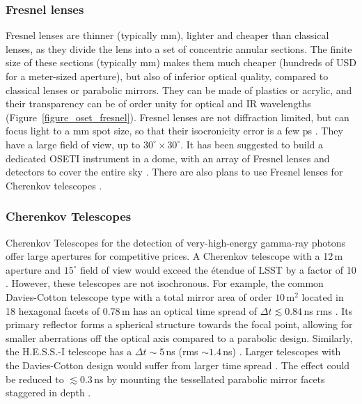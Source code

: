 \documentclass[twocolumn,tighten,longauthor]{myaastex62}
\begin{document}
\subsubsection{Fresnel lenses}
\label{sub:fresnel}
Fresnel lenses are thinner (typically mm), lighter and cheaper than classical lenses, as they divide the lens into a set of concentric annular sections. The finite size of these sections (typically mm) makes them much cheaper (hundreds of USD for a meter-sized aperture), but also of inferior optical quality, compared to classical lenses or parabolic mirrors. They can be made of plastics or acrylic, and their transparency can be of order unity for optical and IR wavelengths (Figure~\ref{figure_oset_fresnel}). Fresnel lenses are not diffraction limited, but can focus light to a mm spot size, so that their isocronicity error is a few ps \citep{2007ITNS...54..313C}. They have a large field of view, up to $30^{\circ}\times30^{\circ}$. It has been suggested to build a dedicated OSETI instrument in a dome, with an array of Fresnel lenses and detectors to cover the entire sky \citep{2013APS..APR.S2002C}. There are also plans to use Fresnel lenses for Cherenkov telescopes \citep{2002MmSAI..73.1211C,2008ICRC....3.1297M,2010arXiv1006.2266A}.


\subsubsection{Cherenkov Telescopes}
\label{sub:cherenkov}
Cherenkov Telescopes for the detection of very-high-energy gamma-ray photons offer large apertures for competitive prices. A Cherenkov telescope with a 12\,m aperture and $15^{\circ}$ field of view would exceed the \'{e}tendue of LSST by a factor of 10 \citep{2007APh....28...10V}. However, these telescopes are not isochronous. For example, the common Davies-Cotton telescope type with a total mirror area of order $10\,$m$^2$ located in 18 hexagonal facets of 0.78\,m has an optical time spread of $\Delta t\lesssim0.84\,$ns rms \citep{2013arXiv1307.3137M}. Its primary reflector forms a spherical structure towards the focal point, allowing for smaller aberrations off the optical axis compared to a parabolic design. Similarly, the H.E.S.S.-I telescope has a $\Delta t \sim 5\,$ns (rms $\sim1.4\,$ns) \citep{Akhperjanian2004,Schliesser2005}. Larger telescopes with the Davies-Cotton design would suffer from larger time spread \citep{Davies1957,2007APh....28...10V}. The effect could be reduced to $\lesssim0.3\,$ns by mounting the tessellated parabolic mirror facets staggered in depth \citep{2013APh....43..331D}.
\end{document}
